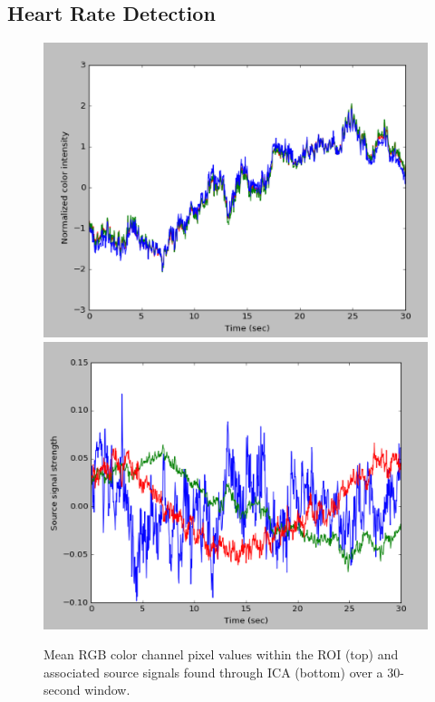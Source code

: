 \documentclass[11pt,twocolumn,letterpaper]{article}
\begin{document}
\subsection*{Heart Rate Detection}

\begin{figure}
\begin{center}
	\includegraphics[scale=0.41]{rgb_signals}
	\includegraphics[scale=0.4]{src_signals}
\end{center}
\caption{Mean RGB color channel pixel values within the ROI (top) and associated source signals found through ICA (bottom) over a 30-second window.}
\label{time_plots}
\end{figure}
\end{document}

